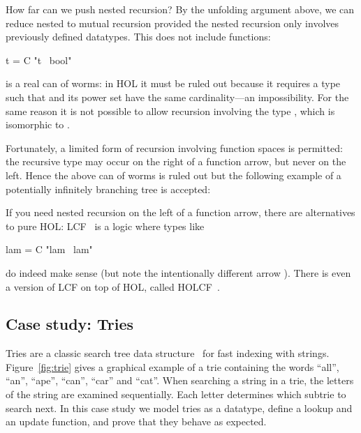How far can we push nested recursion? By the unfolding argument above, we can
reduce nested to mutual recursion provided the nested recursion only involves
previously defined datatypes. This does not include functions:
\begin{isabelle}
 t = C "t \isasymRightarrow\ bool"
\end{isabelle}
is a real can of worms: in HOL it must be ruled out because it requires a type
 such that  and its power set  have the
same cardinality---an impossibility. For the same reason it is not possible
to allow recursion involving the type , which is isomorphic to
.

Fortunately, a limited form of recursion
involving function spaces is permitted: the recursive type may occur on the
right of a function arrow, but never on the left. Hence the above can of worms
is ruled out but the following example of a potentially infinitely branching tree is
accepted:
\smallskip


\bigskip

If you need nested recursion on the left of a function arrow, there are
alternatives to pure HOL: LCF~\cite{paulson87} is a logic where types like
\begin{isabelle}
 lam = C "lam \isasymrightarrow\ lam"
\end{isabelle}
do indeed make sense (but note the intentionally different arrow
\isa{\isasymrightarrow}). There is even a version of LCF on top of HOL,
called HOLCF~\cite{MuellerNvOS99}.


\subsection{Case study: Tries}

Tries are a classic search tree data structure~\cite{Knuth3-75} for fast
indexing with strings. Figure~\ref{fig:trie} gives a graphical example of a
trie containing the words ``all'', ``an'', ``ape'', ``can'', ``car'' and
``cat''.  When searching a string in a trie, the letters of the string are
examined sequentially. Each letter determines which subtrie to search next.
In this case study we model tries as a datatype, define a lookup and an
update function, and prove that they behave as expected.


